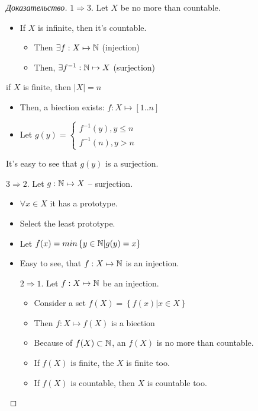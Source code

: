 \begin{proof}[Доказательство]
	$1 \Rightarrow 3$. Let $X$ be no more than countable.
		\begin{itemize}
			\item If $X$ is infinite, then it's countable.
				\begin{itemize}
					\item Then $\exists f: X \mapsto \mathbb{N}$ (injection)
					\item Then, $\exists f^{-1}: \mathbb{N} \mapsto X$ (surjection) 
				\end{itemize}
		\end{itemize}
	\item if $X$ is finite, then $|X| = n$
		 \begin{itemize}
			 \item Then, a biection exists: $f: X \mapsto [1..n]$
			 \item  Let $g(y) = \begin{cases}
			 	f^{-1}(y), y \leq n\\
				f^{-1}(n), y > n
			 \end{cases}$
		\end{itemize}
	\item It's easy to see that $g(y)$ is a surjection.
	
	$3 \Rightarrow 2$. Let $g: \mathbb{N} \mapsto X$ -- surjection.
	\begin{itemize}
		\item $\forall x \in X$ it has a prototype.
		\item Select the least prototype.
		\item Let $f(x) = min \left\{ y \in \mathbb{N} | g(y) = x \right \} $ 
		\item Easy to see, that $f: X \mapsto \mathbb{N}$ is an injection.

		$2 \Rightarrow 1$. Let $f: X \mapsto \mathbb{N}$ be an injection.
		\begin{itemize}
			\item Consider a set $f(X) = \left\{ f(x) | x \in X \right \} $ 
			\item Then $f: X \mapsto  f(X)$ is a biection
			\item Because of $f(X) \subset \mathbb{N}$, an $f(X)$ is no more than countable.
			\item If $f(X)$ is finite, the $X$ is finite too.
			\item If $f(X)$ is countable, then $X$ is countable too. 
		\end{itemize}
	\end{itemize}
\end{proof}

